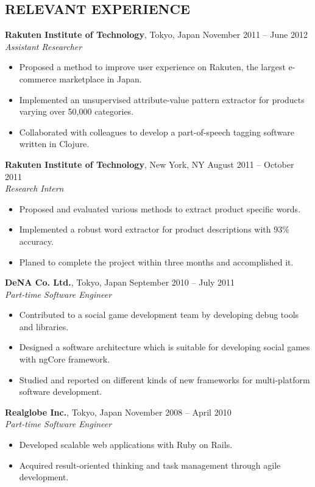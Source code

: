 \documentclass[10pt]{res}
\begin{document}
\begin{resume}
\section{\uppercase{Relevant Experience}}
\textbf{Rakuten Institute of Technology}, Tokyo, Japan \hfill November 2011 -- June 2012\\
\textit{Assistant Researcher}
\begin{itemize}
  \item Proposed a method to improve user experience on Rakuten, the largest e-commerce marketplace in Japan.
  \item Implemented an unsupervised attribute-value pattern extractor for products varying over 50,000 categories.
  \item Collaborated with colleagues to develop a part-of-speech tagging software written in Clojure.
\end{itemize}
\textbf{Rakuten Institute of Technology}, New York, NY \hfill August 2011 -- October 2011\\
\textit{Research Intern}
\begin{itemize}
  \item Proposed and evaluated various methods to extract product specific words.
  \item Implemented a robust word extractor for product descriptions with 93\% accuracy.
  \item Planed to complete the project within three months and accomplished it.
\end{itemize}
\textbf{DeNA Co. Ltd.}, Tokyo, Japan \hfill September 2010 -- July 2011\\
\textit{Part-time Software Engineer}
\begin{itemize}
  \item Contributed to a social game development team by developing debug tools and libraries.
  \item Designed a software architecture which is suitable for developing social games with ngCore framework.
  \item Studied and reported on different kinds of new frameworks for multi-platform software development.
\end{itemize}
\textbf{Realglobe Inc.}, Tokyo, Japan \hfill November 2008 -- April 2010\\
\textit{Part-time Software Engineer}
\begin{itemize}
  \item Developed scalable web applications with Ruby on Rails.
  \item Acquired result-oriented thinking and task management through agile development.
\end{itemize}


\end{resume}
\end{document}
